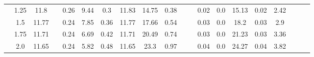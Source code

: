 \documentclass[a4paper,12pt]{article}
\begin{document}
\begin{table}[htbp]
\begin{tabular}{|c|c|c|c|c|c|c|c|c|c|c|c|c|c|c|c|c|c|c|c|}
			& 1.25       & 11.8       &                       & 0.26          & 9.44          & 0.3           & 11.83         & 14.75         & 0.38          &                        &                         & 0.02               & 0.0                & 15.13      & 0.02            & 2.42                &                       &                       &                       \\ \cline{2-3} \cline{5-10} \cline{13-17}
			& 1.5        & 11.77      &                       & 0.24          & 7.85          & 0.36          & 11.77         & 17.66         & 0.54          &                        &                         & 0.03               & 0.0                & 18.2       & 0.03            & 2.9                 &                       &                       &                       \\ \cline{2-3} \cline{5-10} \cline{13-17}
			& 1.75       & 11.71      &                       & 0.24          & 6.69          & 0.42          & 11.71         & 20.49         & 0.74          &                        &                         & 0.03               & 0.0                & 21.23      & 0.03            & 3.36                &                       &                       &                       \\ \cline{2-3} \cline{5-10} \cline{13-17}
			& 2.0        & 11.65      &                       & 0.24          & 5.82          & 0.48          & 11.65         & 23.3          & 0.97          &                        &                         & 0.04               & 0.0                & 24.27      & 0.04            & 3.82                &                       &                       &                       \\ \hline
		\end{tabular}%
	\end{table}
	
	
	
\end{document}
